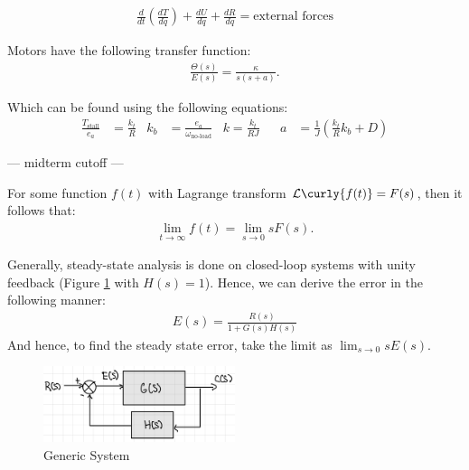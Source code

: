 \documentclass{article}
\begin{document}
\begin{align*}
  \frac{d}{dt} \left(\frac{dT}{d\dot{q}}\right) + \frac{dU}{dq} + \frac{dR}{d\dot{q}} = \text{external forces}
\end{align*}


Motors have the following transfer function:
\begin{align*}
  \frac{\Theta(s)}{E(s)} = \frac{\kappa}{s(s+a)}.
\end{align*}

Which can be found using the following equations:
\begin{align*}
  \frac{T_\text{stall}}{e_a} &= \frac{k_t}{R} & k_b &= \frac{e_a}{\omega_\text{no-load}} & k = \frac{k_t}{RJ} &&  a &= \frac{1}{J}\left(\frac{k_t}{R}k_b + D\right)
\end{align*}

\begin{center}
---  midterm cutoff ---
\end{center}

\vfill \pagebreak


 For some function $f(t)$ with Lagrange transform $\mathcal{L}\curly{f(t)} = F(s)$, then it follows that:
\begin{align*}
  \lim_{t \to \infty} f(t) = \lim_{s \to 0}s F(s).
\end{align*}

Generally, steady-state analysis is done on closed-loop systems with unity feedback (Figure \ref{fig:steady-state} with $H(s) = 1$). Hence, we can derive the error in the following manner:
\begin{align*}
  E(s) = \frac{R(s)}{1 + G(s) H(s)}
\end{align*}
And hence, to find the steady state error, take the limit as $\lim_{s\to 0 } sE(s)$.

\begin{figure}[htbp]
  \centering
  \begin{center}
    \includegraphics[width=0.5\textwidth]{images/standard_diagram.png}
  \end{center}
  \caption{Generic System}
  \label{fig:steady-state}
\end{figure}
\end{document}

